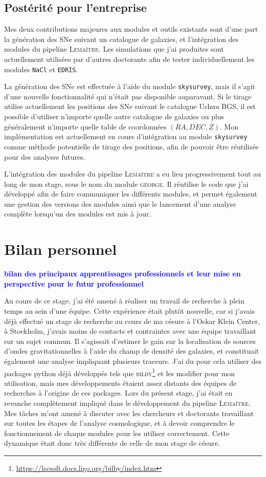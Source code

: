 \documentclass{book}
\newcommand{\consignes}[1]{{\textcolor{blue}{\bf \large #1}}}
\def\lemaitre{\textsc{Lemaître}\xspace}
\def\skysurvey{\texttt{skysurvey}\xspace}
\def\nacl{\texttt{NaCl}\xspace}
\def\edris{\texttt{EDRIS}\xspace}
\begin{document}
\section{Postérité pour l'entreprise}

Mes deux contributions majeures aux modules et outils existants sont d'une part la génération des SNe suivant un catalogue de galaxies, et l'intégration des modules du pipeline \lemaitre. Les simulations que j'ai produites sont actuellement utilisées par d'autres doctorants afin de tester individuellement les modules \nacl et \edris.

La génération des SNe est effectuée à l'aide du module \skysurvey, mais il s'agit d'une nouvelle fonctionnalité qui n'était pas disponible auparavant. Si le tirage utilise actuellement les positions des SNe suivant le catalogue Uchuu BGS, il est possible d'utiliser n'importe quelle autre catalogue de galaxies ou plus généralement n'importe quelle table de coordonnées $(RA,DEC,Z)$. Mon implémentation est actuellement en cours d'intégration au module \skysurvey comme méthode potentielle de tirage des positions, afin de pouvoir être réutilisée pour des analyses futures.

L'intégration des modules du pipeline \lemaitre a eu lieu progressivement tout au long de mon stage, sous le nom du module \textsc{george}. Il réutilise le code que j'ai développé afin de faire communiquer les différents modules, et permet également une gestion des versions des modules ainsi que le lancement d'une analyse complète lorsqu'un des modules est mis à jour.


\chapter{Bilan personnel}
\consignes{bilan des principaux apprentissages professionnels et leur mise en perspective pour le futur professionnel}

Au cours de ce stage, j'ai été amené à réaliser un travail de recherche à plein temps au sein d'une équipe. Cette expérience était plutôt nouvelle, car si j'avais déjà effectué un stage de recherche au cours de ma césure à l'Oskar Klein Center, à Stockholm, j'avais moins de contacts et contraintes avec une équipe travaillant sur un sujet commun. Il s'agissait d'estimer le gain sur la localisation de sources d'ondes gravitationnelles à l'aide du champ de densité des galaxies, et constituait également une analyse impliquant plusieurs traceurs. J'ai du pour cela utiliser des packages python déjà développés tels que \textsc{bilby}\footnote{\href{https://lscsoft.docs.ligo.org/bilby/index.html}{https://lscsoft.docs.ligo.org/bilby/index.htm}} et les modifier pour mon utilisation, mais mes développements étaient assez distants des équipes de recherches à l'origine de ces packages. Lors du présent stage, j'ai était en revanche complètement impliqué dans le développement du pipeline \lemaitre. Mes tâches m'ont amené à discuter avec les chercheurs et doctorants travaillant sur toutes les étapes de l'analyse cosmologique, et à devoir comprendre le fonctionnement de chaque modules pour les utiliser correctement. Cette dynamique était donc très différente de celle de mon stage de césure.
\end{document}
